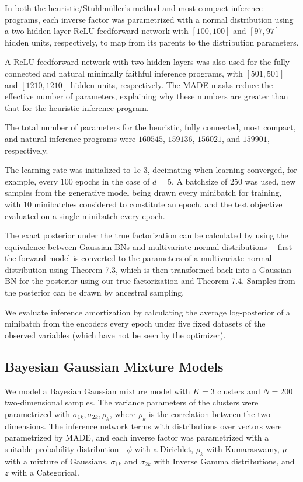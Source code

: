 \documentclass{article}
\begin{document}
In both the heuristic/Stuhlm{\"u}ller's method and most compact inference programs, each inverse factor was parametrized with a normal distribution using a two hidden-layer ReLU feedforward network with $[100,100]$ and $[97,97]$ hidden units, respectively, to map from its parents to the distribution parameters.

A ReLU feedforward network with two hidden layers was also used for the fully connected and natural minimally faithful inference programs, with $[501,501]$ and $[1210,1210]$ hidden units, respectively. The MADE masks reduce the effective number of parameters, explaining why these numbers are greater than that for the heuristic inference program.

The total number of parameters for the heuristic, fully connected, most compact, and natural inference programs were $160545$, $159136$, $156021$, and $159901$, respectively.

The learning rate was initialized to {\ttfamily 1e-3}, decimating when learning converged, for example, every $100$ epochs in the case of $d=5$. A batchsize of $250$ was used, new samples from the generative model being drawn every minibatch for training, with 10 minibatches considered to constitute an epoch, and the test objective evaluated on a single minibatch every epoch.

The exact posterior under the true factorization can be calculated by using the equivalence between Gaussian BNs and multivariate normal distributions \citep[\S7.2]{KollerFriedman2009}---first the forward model is converted to the parameters of a multivariate normal distribution using Theorem 7.3, which is then transformed back into a Gaussian BN for the posterior using our true factorization and Theorem 7.4.
Samples from the posterior can be drawn by ancestral sampling.

We evaluate inference amortization by calculating the average log-posterior of a minibatch from the encoders every epoch under five fixed datasets of the observed variables (which have not be seen by the optimizer).

\subsection{Bayesian Gaussian Mixture Models}
We model a Bayesian Gaussian mixture model with $K=3$ clusters and $N=200$ two-dimensional samples. The variance parameters of the clusters were parametrized with $\sigma_{1k},\sigma_{2k},\rho_k$, where $\rho_k$ is the correlation between the two dimensions.  The inference network terms with distributions over vectors were parametrized by MADE, and each inverse factor was parametrized with a suitable probability distribution---$\phi$ with a Dirichlet, $\rho_k$ with Kumaraswamy, $\mu$ with a mixture of Gaussians, $\sigma_{1k}$ and $\sigma_{2k}$ with Inverse Gamma distributions, and $z$ with a Categorical.
\end{document}
